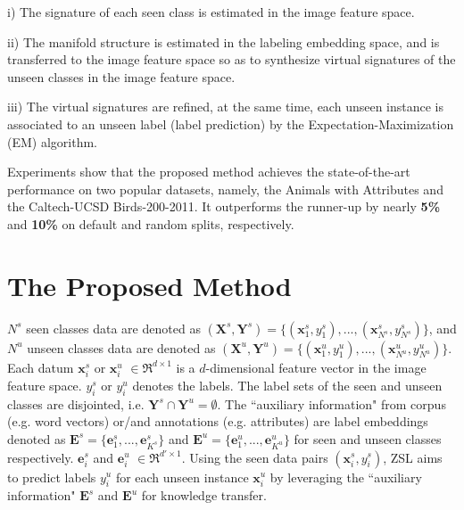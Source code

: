 \documentclass{article}
\begin{document}
i) The signature of each seen class is estimated in the image feature space.

ii) The manifold structure is estimated in the labeling embedding space, and is transferred to the image feature space so as to synthesize virtual signatures of the unseen classes in the image feature space.

iii) The virtual signatures are refined, at the same time, each unseen instance is associated to an unseen label (label prediction) by the Expectation-Maximization (EM) algorithm.

Experiments show that the proposed method achieves the state-of-the-art performance on two popular datasets, namely, the Animals with Attributes and the Caltech-UCSD Birds-200-2011. It outperforms the runner-up by nearly \textbf{5\%} and \textbf{10\%} on default and random splits, respectively.

\section{The Proposed Method}


$N^s$ seen classes data are denoted as $(\bm{X}^s,\bm{Y}^s)=\{(\bm{x}^s_1,{y}^s_1),...,(\bm{x}^s_{N^s},{y}^s_{N^s})\}$, and $N^u$ unseen classes data are denoted as $(\bm{X}^u,\bm{Y}^u)=\{(\bm{x}^u_1,{y}^u_1),...,(\bm{x}^u_{N^u},{y}^u_{N^u})\}$.
Each datum $\bm{x}^s_{i}$ or $\bm{x}^u_{i}$ $\in \Re^{d \times 1}$ is a $d$-dimensional feature vector in the image feature space.
${y}^s_i$ or ${y}^u_i$ denotes the labels. The label sets of the seen and unseen classes are disjointed, i.e. $ \bm{Y}^s \cap \bm{Y}^u = \emptyset$. The ``auxiliary information" from corpus (e.g. word vectors) or/and annotations (e.g. attributes) are label embeddings denoted as $\bm{E}^s=\{\bm{e}^s_1,...,\bm{e}^s_{K^s}\}$ and $\bm{E}^u=\{\bm{e}^u_1,...,\bm{e}^u_{K^u}\}$ for seen and unseen classes respectively. $\bm{e}^s_{i}$ and $\bm{e}^u_{i}$ $\in \Re^{d' \times 1}$.
Using the seen data pairs $(\bm{x}^s_i,{y}^s_i)$, ZSL aims to predict labels ${y}^u_i$ for each unseen instance $\bm{x}^u_i$ by leveraging the ``auxiliary information" $\bm{E}^s$ and $\bm{E}^u$ for knowledge transfer.
\end{document}
